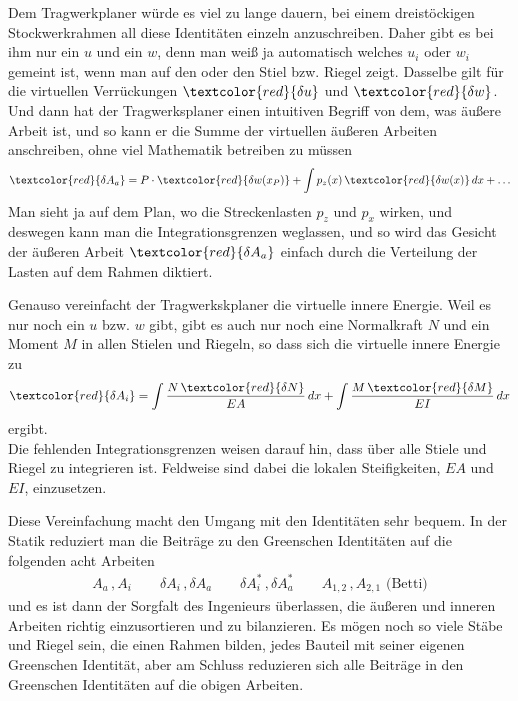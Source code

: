 Dem Tragwerkplaner w\"{u}rde es viel zu lange dauern, bei einem dreist\"{o}ckigen Stockwerkrahmen all diese Identit\"{a}ten einzeln anzuschreiben. Daher gibt es bei ihm nur ein $u$ und ein $w$, denn man wei{\ss} ja automatisch welches $u_i $ oder $w_i $ gemeint ist, wenn man auf den oder den Stiel bzw. Riegel zeigt. Dasselbe gilt f\"{u}r die virtuellen Verr\"{u}ckungen $\textcolor{red}{\delta u}$ und $\textcolor{red}{\delta w}$. Und dann hat der Tragwerksplaner einen intuitiven Begriff von dem, was \"{a}u{\ss}ere Arbeit ist, und so kann er die Summe der virtuellen \"{a}u{\ss}eren Arbeiten anschreiben, ohne viel Mathematik betreiben zu m\"{u}ssen
\begin{align}\label{Eq33}
\textcolor{red}{\delta A_a} = P\cdot\textcolor{red}{\delta w(x_P)} + \int p_z(x)\,\textcolor{red}{\delta w(x)}\,dx + \ldots
\end{align}
Man sieht ja auf dem Plan, wo die Streckenlasten $p_z$ und $p_x$ wirken, und deswegen kann man die Integrationsgrenzen weglassen, und so wird das Gesicht der \"{a}u{\ss}eren Arbeit $\textcolor{red}{\delta A_a} $ einfach durch die Verteilung der Lasten auf dem Rahmen diktiert.

Genauso vereinfacht der Tragwerkskplaner die virtuelle innere Energie. Weil es nur noch ein $u$ bzw. $w$ gibt, gibt es auch nur noch eine Normalkraft $N$ und ein Moment $M$ in allen Stielen und Riegeln, so dass sich die virtuelle innere Energie zu
\begin{align}
\textcolor{red}{\delta A_i} = \int \frac{N\,\textcolor{red}{\delta N}}{EA}\,dx + \int \frac{M\,\textcolor{red}{\delta M}}{EI}\,dx
\end{align}
ergibt.\\

Die fehlenden Integrationsgrenzen weisen darauf hin, dass \"{u}ber alle Stiele und Riegel zu integrieren ist. Feldweise sind dabei die lokalen Steifigkeiten, $EA $ und $EI $, einzusetzen.

Diese Vereinfachung macht den Umgang mit den Identit\"{a}ten sehr bequem. In der Statik reduziert man die Beitr\"{a}ge zu den Greenschen Identit\"{a}ten auf die folgenden acht Arbeiten
\begin{align}
A_a\,, A_i \qquad \delta A_i\,, \delta A_a \qquad \delta A_i^*\,, \delta A_a^* \qquad A_{1,2}\,, A_{2,1}\,\,\text{(Betti)}
\end{align}
und es ist dann der Sorgfalt des Ingenieurs \"{u}berlassen, die \"{a}u{\ss}eren und inneren Arbeiten richtig einzusortieren und zu bilanzieren. Es m\"{o}gen noch so viele St\"{a}be und Riegel sein, die einen Rahmen bilden, jedes Bauteil mit seiner eigenen Greenschen Identit\"{a}t, aber am Schluss reduzieren sich alle Beitr\"{a}ge in den Greenschen Identit\"{a}ten auf die obigen Arbeiten.

